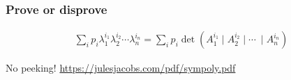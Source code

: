 \documentclass[aspectratio=169,xcolor={usenames,dvipsnames}]{beamer}
\DeclareMathOperator{\tr}{tr}
\newcommand{\R}{\mathbb{R}}
\newcommand{\m}{\!\!\mid\!}
\begin{document}
\begin{frame}\frametitle{Prove or disprove}
  \begin{align*}
    \sum_i p_i \lambda_1^{i_1} \lambda_2^{i_2} \cdots \lambda_n^{i_n} = \sum_i p_i \det(A_1^{i_1} \m A_2^{i_2} \m \cdots\ \m A_n^{i_n})
  \end{align*}

  \vspace{2cm}

  No peeking! \tiny{\url{https://julesjacobs.com/pdf/sympoly.pdf}}
\end{frame}




\end{document}
